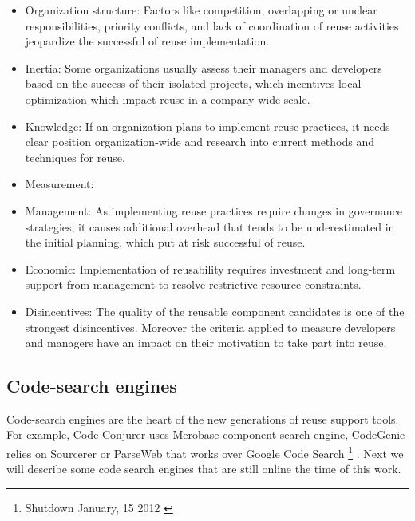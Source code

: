 \begin{itemize}
\item Organization structure: Factors like competition, overlapping or unclear responsibilities, priority conflicts, and lack of coordination of reuse activities jeopardize the successful of reuse implementation. 
\item Inertia: Some organizations usually assess their managers and developers based on the success of their isolated projects, which incentives local optimization which impact reuse in a company-wide scale. 
\item Knowledge: If an organization plans to implement reuse practices, it needs clear position organization-wide and research into current methods and techniques for reuse.
\item Measurement: 
\item Management: As implementing reuse practices require changes in governance strategies, it causes additional overhead that tends to be underestimated in the initial planning, which put at risk successful of reuse.
\item Economic: Implementation of reusability requires investment and long-term support from management to resolve restrictive resource constraints.
\item Disincentives: The quality of the reusable component candidates is one of the strongest disincentives. Moreover the criteria applied to measure developers and managers have an impact on their motivation to take part into reuse.
\end{itemize}

\subsection{Code-search engines}
Code-search engines are the heart of the new generations of reuse support tools. For example, Code Conjurer \cite{Hummel2008} uses Merobase component search engine, CodeGenie relies on Sourcerer \cite{Lemos2007} or ParseWeb that works over Google Code Search \footnote{Shutdown January, 15 2012 \cite{Horowitz2011}} \cite{Thummalapenta2007}. Next we will describe some code search engines that are still online the time of this work.


